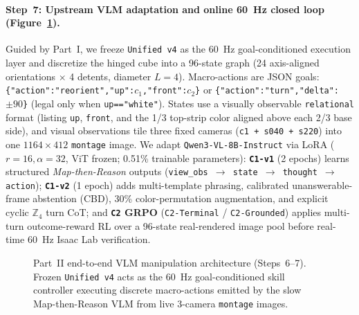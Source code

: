 \paragraph{Step~7: Upstream VLM adaptation and online 60~Hz closed loop (Figure~\ref{fig:vlm_arch}).}
Guided by Part~I, we freeze \texttt{Unified v4} as the 60~Hz goal-conditioned execution layer and discretize the hinged cube into a 96-state graph (24 axis-aligned orientations $\times$ 4 detents, diameter $L=4$).
Macro-actions are JSON goals: \texttt{\{"action":"reorient","up":$c_1$,"front":$c_2$\}} or \texttt{\{"action":"turn","delta":$\pm 90$\}} (legal only when \texttt{up=="white"}).
States use a visually observable \texttt{relational} format (listing \texttt{up}, \texttt{front}, and the 1/3 top-strip color aligned above each 2/3 base side), and visual observations tile three fixed cameras (\texttt{c1 + s040 + s220}) into one $1164\times 412$ \texttt{montage} image.
We adapt \texttt{Qwen3-VL-8B-Instruct} via LoRA ($r=16, \alpha=32$, ViT frozen; 0.51\% trainable parameters):
\textbf{\texttt{C1-v1}} (2 epochs) learns structured \emph{Map-then-Reason} outputs (\texttt{view\_obs $\to$ state $\to$ thought $\to$ action});
\textbf{\texttt{C1-v2}} (1 epoch) adds multi-template phrasing, calibrated unanswerable-frame abstention (CBD), 30\% color-permutation augmentation, and explicit cyclic $\mathbb{Z}_4$ turn CoT; and
\textbf{\texttt{C2} GRPO} (\texttt{C2-Terminal} / \texttt{C2-Grounded}) applies multi-turn outcome-reward RL \citep{shao2024deepseekmath} over a 96-state real-rendered image pool before real-time 60~Hz Isaac Lab verification.

\begin{figure}[t]
  \centering
  
  \caption{Part~II end-to-end VLM manipulation architecture (Steps~6--7). Frozen \texttt{Unified v4} acts as the 60~Hz goal-conditioned skill controller executing discrete macro-actions emitted by the slow Map-then-Reason VLM from live 3-camera \texttt{montage} images.}
  \label{fig:vlm_arch}
\end{figure}
